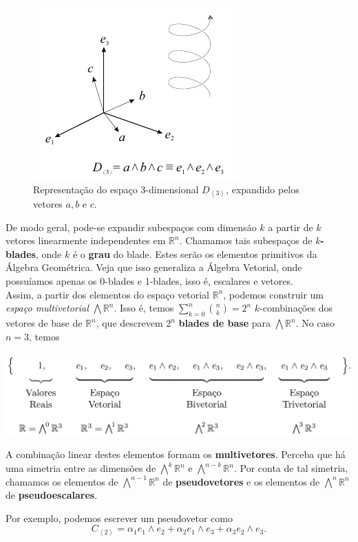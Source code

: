 \documentclass[11pt]{article}
\begin{document}
\begin{figure}[H]
	\begin{center}
		\includegraphics[width=0.3\linewidth]{figures/3blade.png}
	\end{center}
	\caption{Representação do espaço 3-dimensional $D_{\left < 3 \right >}$, expandido pelos vetores $a, b $ e $c$.}
	\label{fig:3blade}
\end{figure}

De modo geral, pode-se expandir subespaços com dimensão $k$ a partir de $k$ vetores linearmente independentes em $\mathbb{R}^n$. Chamamos tais subespaços de \textbf{$k$-blades}, onde $k$ é o \textbf{grau} do blade. Estes serão os elementos primitivos da Álgebra Geométrica. Veja que isso generaliza a Álgebra Vetorial, onde possuíamos apenas os 0-blades e 1-blades, isso é, escalares e vetores. 
\\

Assim, a partir dos elementos do espaço vetorial $\mathbb{R}^n$, podemos construir um \textit{espaço multivetorial} $\bigwedge\mathbb{R}^n$. Isso é, temos $\sum_{k=0}^{n} {n\choose k} = 2^n$ $k$-combinações dos vetores de base de $\mathbb{R}^n$, que descrevem $2^n$ \textbf{blades de base} para $\bigwedge\mathbb{R}^n$. No caso $n =3$, temos

\begin{center}
	\includegraphics[width=0.75\linewidth]{figures/wr3.png}
\end{center}

A combinação linear destes elementos formam os \textbf{multivetores}. Perceba que há uma simetria entre as dimensões de $\bigwedge^k\mathbb{R}^n$ e $\bigwedge^{n-k}\mathbb{R}^n$.
Por conta de tal simetria, chamamos os elementos de $\bigwedge^{n-1}\mathbb{R}^n$ de \textbf{pseudovetores} e os elementos de $\bigwedge^{n}\mathbb{R}^n$ de \textbf{pseudoescalares}.

Por exemplo, podemos escrever um pseudovetor como 
$$C_{\left < 2\right >} = \alpha_1 e_1\wedge e_2 + \alpha_2 e_1 \wedge e_3 + \alpha_3 e_2 \wedge e_3.$$
\end{document}

